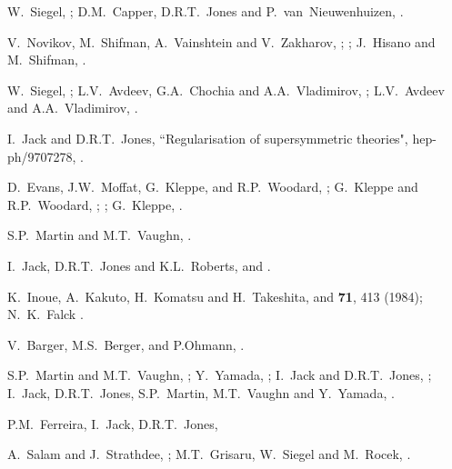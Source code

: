 \begin{thebibliography}{99}
 W.~Siegel, ;
D.M.~Capper, D.R.T.~Jones and P.~van~Nieuwenhuizen,
.

 V.~Novikov, M.~Shifman, A.~Vainshtein and
V.~Zakharov, ;
; J.~Hisano and M.~Shifman,
.

 W.~Siegel, ;
L.V.~Avdeev, G.A.~Chochia and A.A.~Vladimirov, 
;
L.V.~Avdeev and A.A.~Vladimirov, .

 I.~Jack and D.R.T.~Jones, ``Regularisation
of supersymmetric theories", hep-ph/9707278,
\perspectives.

 D.~Evans, J.W.~Moffat, G.~Kleppe, and R.P.~Woodard,
;
G.~Kleppe and R.P.~Woodard, ;
;
G.~Kleppe, .


 S.P.~Martin and M.T.~Vaughn,
.

 I.~Jack, D.R.T.~Jones and K.L.~Roberts,
 and
.

K.~Inoue, A.~Kakuto, H.~Komatsu and H.~Takeshita,
 and {\bf 71}, 413 (1984);
N.~K.~Falck .

 V.~Barger, M.S.~Berger, and P.Ohmann,
.

S.P.~Martin and M.T.~Vaughn, ;
Y.~Yamada, ;
I.~Jack and D.R.T.~Jones, ;
I.~Jack, D.R.T.~Jones, S.P.~Martin, M.T.~Vaughn
and Y.~Yamada, .

 P.M.~Ferreira, I.~Jack, D.R.T.~Jones,

A.~Salam and J.~Strathdee, ;
M.T.~Grisaru, W.~Siegel and M.~Rocek, .


\end{thebibliography}
